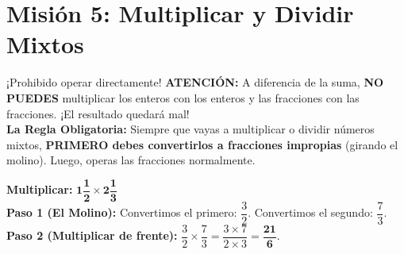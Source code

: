 \documentclass[12pt, letterpaper]{article}
\begin{document}
	
	\section*{Misión 5: Multiplicar y Dividir Mixtos}
	
	\begin{concepto}{¡Prohibido operar directamente!}
		\textbf{ATENCIÓN:} A diferencia de la suma, \textbf{NO PUEDES} multiplicar los enteros con los enteros y las fracciones con las fracciones. ¡El resultado quedará mal!
		\\[0.2cm]
		\textbf{La Regla Obligatoria:} Siempre que vayas a multiplicar o dividir números mixtos, \textbf{PRIMERO debes convertirlos a fracciones impropias} (girando el molino). Luego, operas las fracciones normalmente.
	\end{concepto}
	
	\begin{ejemplo}
		\textbf{Multiplicar:} $\mathbf{1 \dfrac{1}{2} \times 2 \dfrac{1}{3}}$\\[0.1cm]
		\textbf{Paso 1 (El Molino):} Convertimos el primero: $\dfrac{3}{2}$. Convertimos el segundo: $\dfrac{7}{3}$.\\
		\textbf{Paso 2 (Multiplicar de frente):} $\dfrac{3}{2} \times \dfrac{7}{3} = \dfrac{3 \times 7}{2 \times 3} = \mathbf{\dfrac{21}{6}}$.
	\end{ejemplo}
	
\end{document}
